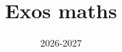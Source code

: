 \documentclass[11pt,a4paper]{article}
\begin{document}
\title{Exos maths}
\author{}
\date{2026-2027}

\maketitle


 
\end{document}
